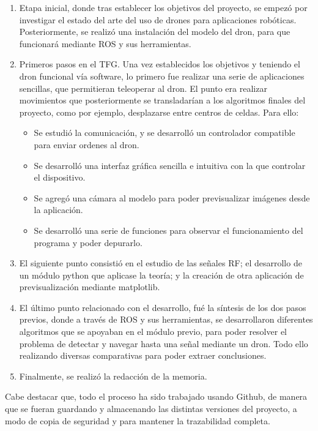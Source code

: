 \begin{enumerate}
	\item Etapa inicial, donde tras establecer los objetivos del proyecto, se empezó por investigar el estado del arte del uso de drones para aplicaciones robóticas. Posteriormente, se realizó una instalación del modelo del dron, para que funcionará mediante \ac{ROS} y sus herramientas. 
	\item Primeros pasos en el \ac{TFG}. Una vez establecidos los objetivos y teniendo el dron funcional vía software, lo primero fue realizar una serie de aplicaciones sencillas, que permitieran teleoperar al dron. El punto era realizar movimientos que posteriormente se transladarían a los algoritmos finales del proyecto, como por ejemplo, desplazarse entre centros de celdas. Para ello:
	\begin{itemize}
		\item Se estudió la comunicación, y se desarrolló un controlador compatible para enviar ordenes al dron.
		\item Se desarrolló una interfaz gráfica sencilla e intuitiva con la que controlar el dispositivo.
		\item Se agregó una cámara al modelo para poder previsualizar imágenes desde la aplicación.
		\item Se desarrolló una serie de funciones para observar el funcionamiento del programa y poder depurarlo.
    \end{itemize}
	\item El siguiente punto consistió en el estudio de las señales \ac{RF}; el desarrollo de un módulo python que aplicase la teoría; y la creación de otra aplicación de previsualización mediante matplotlib.
	\item El último punto relacionado con el desarrollo, fué la síntesis de los dos pasos previos, donde a través de \ac{ROS} y sus herramientas, se desarrollaron diferentes algoritmos que se apoyaban en el módulo previo, para poder resolver el problema de detectar y navegar hasta una señal mediante un dron. Todo ello realizando diversas comparativas para poder extraer conclusiones.
	\item Finalmente, se realizó la redacción de la memoria.
\end{enumerate}

Cabe destacar que, todo el proceso ha sido trabajado usando Github, de manera que se fueran guardando y almacenando las distintas versiones del proyecto, a modo de copia de seguridad y para mantener la trazabilidad completa.